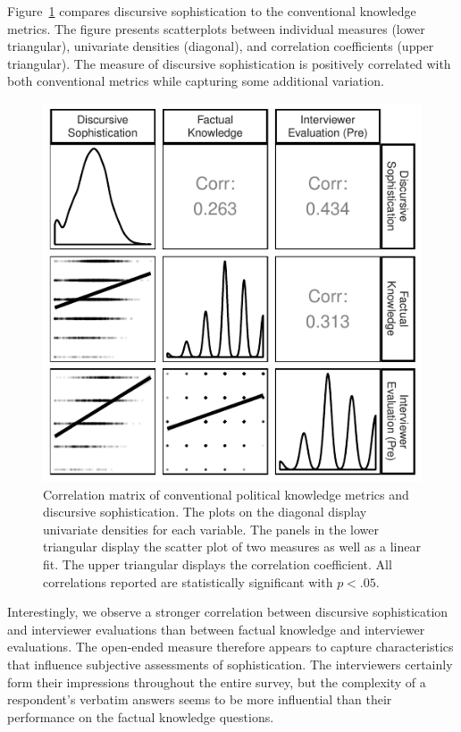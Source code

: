 \documentclass[12pt]{article}
\begin{document}

Figure~\ref{fig:corplot} compares discursive sophistication to the conventional knowledge metrics. The figure presents scatterplots between individual measures (lower triangular), univariate densities (diagonal), and correlation coefficients (upper triangular). The measure of discursive sophistication is positively correlated with both conventional metrics while capturing some additional variation.

\begin{figure}[h]\centering
\includegraphics{../fig/corplot_pres.pdf}
\caption{Correlation matrix of conventional political knowledge metrics and discursive sophistication. The plots on the diagonal display univariate densities for each variable. The panels in the lower triangular display the scatter plot of two measures as well as a linear fit. The upper triangular displays the correlation coefficient. All correlations reported are statistically significant with $p<.05$.}\label{fig:corplot}
\end{figure}

Interestingly, we observe a stronger correlation between discursive sophistication and interviewer evaluations than between factual knowledge and interviewer evaluations. The open-ended measure therefore appears to capture characteristics that influence subjective assessments of sophistication. The interviewers certainly form their impressions throughout the entire survey, but the complexity of a respondent's verbatim answers seems to be more influential than their performance on the factual knowledge questions.
\end{document}

